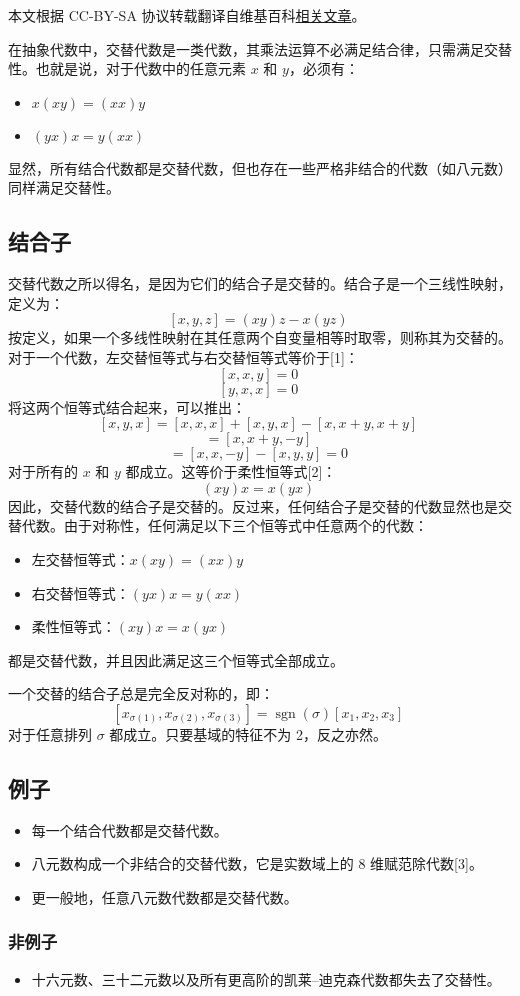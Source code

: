 
本文根据 CC-BY-SA 协议转载翻译自维基百科\href{https://en.wikipedia.org/wiki/Alternative_algebra}{相关文章}。

在抽象代数中，交替代数是一类代数，其乘法运算不必满足结合律，只需满足交替性。也就是说，对于代数中的任意元素 $x$ 和 $y$，必须有：
\begin{itemize}
\item $x(xy) = (xx)y$
\item $(yx)x = y(xx)$
\end{itemize}
显然，所有结合代数都是交替代数，但也存在一些严格非结合的代数（如八元数）同样满足交替性。
\subsection{结合子}
交替代数之所以得名，是因为它们的结合子是交替的。结合子是一个三线性映射，定义为：
$$
[x, y, z] = (xy)z - x(yz)~
$$
按定义，如果一个多线性映射在其任意两个自变量相等时取零，则称其为交替的。对于一个代数，左交替恒等式与右交替恒等式等价于[1]：
$$
[x, x, y] = 0~
$$
$$
[y, x, x] = 0~
$$
将这两个恒等式结合起来，可以推出：
$$
[x, y, x] = [x, x, x] + [x, y, x] - [x, x+y, x+y]~
$$
$$
= [x, x+y, -y]~
$$
$$
= [x, x, -y] - [x, y, y] = 0~
$$
对于所有的 $x$ 和 $y$ 都成立。这等价于柔性恒等式[2]：
$$
(xy)x = x(yx)~
$$
因此，交替代数的结合子是交替的。反过来，任何结合子是交替的代数显然也是交替代数。由于对称性，任何满足以下三个恒等式中任意两个的代数：
\begin{itemize}
\item 左交替恒等式：$x(xy) = (xx)y$
\item 右交替恒等式：$(yx)x = y(xx)$
\item 柔性恒等式：$(xy)x = x(yx)$
\end{itemize}
都是交替代数，并且因此满足这三个恒等式全部成立。

一个交替的结合子总是完全反对称的，即：
$$
[x_{\sigma(1)}, x_{\sigma(2)}, x_{\sigma(3)}] = \operatorname{sgn}(\sigma) [x_1, x_2, x_3]~
$$
对于任意排列 $\sigma$ 都成立。只要基域的特征不为 2，反之亦然。
\subsection{例子}
\begin{itemize}
\item 每一个结合代数都是交替代数。
\item 八元数构成一个非结合的交替代数，它是实数域上的 8 维赋范除代数[3]。
\item 更一般地，任意八元数代数都是交替代数。
\end{itemize}
\subsubsection{非例子}
\begin{itemize}
\item 十六元数、三十二元数以及所有更高阶的凯莱–迪克森代数都失去了交替性。
\end{itemize}